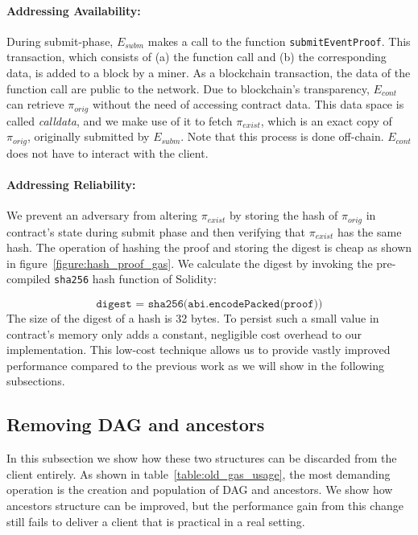 \paragraph{Addressing Availability:}

During submit-phase, $E_{subm}$ makes a call to the function
\texttt{submitEventProof}. This transaction, which consists of (a) the function
call and (b) the corresponding data, is added to a block by a miner. As a
blockchain transaction, the data of the function call are public to the
network. Due to blockchain's transparency, $E_{cont}$ can retrieve
$\pi_{orig}$ without the need of accessing contract data. This data space is
called \emph{calldata}, and we make use of it to fetch $\pi_{exist}$, which is
an exact copy of $\pi_{orig}$, originally submitted by $E_{subm}$. Note that
this process is done off-chain. $E_{cont}$ does not have to interact with the
client.

\paragraph{Addressing Reliability:}

We prevent an adversary from altering $\pi_{exist}$ by storing the hash of
$\pi_{orig}$ in contract's state during submit phase and then verifying that
$\pi_{exist}$ has the same hash. The operation of hashing the proof and storing
the digest is cheap as shown in figure~\ref{figure:hash_proof_gas}. We
calculate the digest by invoking the pre-compiled \texttt{sha256} hash function
of Solidity:

\[\texttt{digest = sha256(abi.encodePacked(proof))}\] The size of the digest of
a hash is 32 bytes. To persist such a small value in contract's memory only
adds a constant, negligible cost overhead to our implementation. This low-cost
technique allows us to provide vastly improved performance compared to the
previous work as we will show in the following subsections.





\subsection{Removing DAG and ancestors}

In this subsection we show how these two structures can be discarded from the
client entirely. As shown in table~\ref{table:old_gas_usage}, the most
demanding operation is the creation and population of DAG and ancestors. We
show how ancestors structure can be improved, but the performance gain from
this change still fails to deliver a client that is practical in a real
setting.

